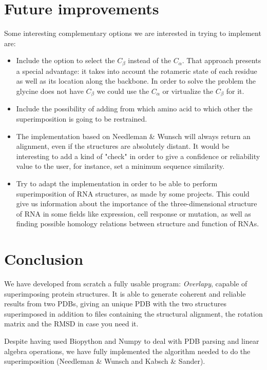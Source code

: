 \documentclass{article}
\begin{document}
\section*{Future improvements}
Some interesting complementary options we are interested in trying to implement are:
\begin{itemize}
	\item Include the option to select the $C_{\beta}$ instead of the $C_{\alpha}$. That approach presents a special advantage: it takes into account the rotameric state of each residue as well as its location along the backbone. In order to solve the problem the glycine does not have $C_{\beta}$ we could use the $C_{\alpha}$ or virtualize  the $C_{\beta}$ for it. 
	\item Include the possibility of adding from which amino acid to which other the superimposition is going to be restrained.
	\item The implementation based on Needleman \& Wunsch will always return an alignment, even if the structures are absolutely distant. It would be interesting to add a kind of "check" in order to give a confidence or reliability value to the user, for instance, set a minimum sequence similarity.
	\item Try to adapt the implementation in order to be able to perform superimposition of RNA structures, as made by some projects\cite{23}. This could give us information about the importance of the three-dimensional structure of RNA in some fields like expression, cell response or mutation, as well as finding possible homology relations between structure and function of RNAs.

\end{itemize}
  
\section*{Conclusion}
We have developed from scratch a fully usable program: \textit{Overlapy}, capable of superimposing protein structures. It is able to generate coherent and reliable results from two PDBs, giving an unique PDB with the two structures superimposed in addition to files containing the structural alignment, the rotation matrix and the RMSD in case you need it.

Despite having used Biopython and Numpy to deal with PDB parsing and linear algebra operations, we have fully implemented the algorithm needed to do the superimposition (Needleman \& Wunsch and Kabsch \& Sander).
\end{document}
